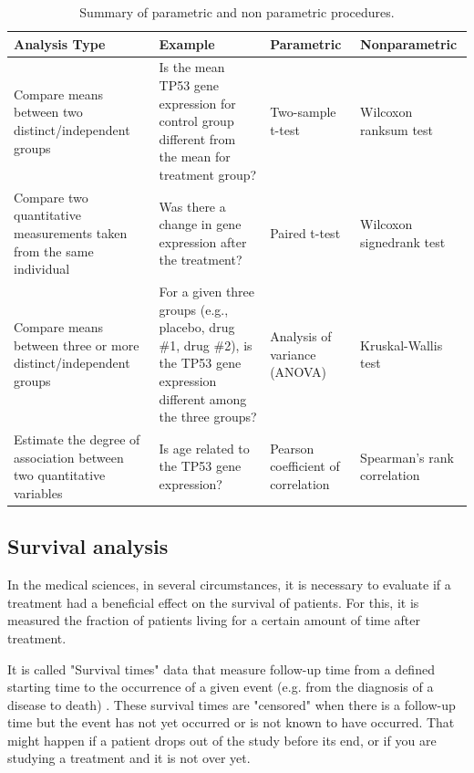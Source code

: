 \bgroup
\def\arraystretch{2.0}%

\begin{table}[h!]
\footnotesize
\centering
\caption{Summary of parametric and non parametric procedures.}
\label{Parametric-nonparametric}
\begin{tabular}{p{3.5cm}p{4cm}p{3cm}p{3cm}}
\toprule
\textbf{Analysis Type} & \textbf{Example} & \textbf{Parametric} & \textbf{Nonparametric} \\ \midrule
Compare means between two distinct/independent groups & Is the mean TP53 gene expression for control group different from the mean for treatment group? & Two-sample t-test & Wilcoxon ranksum test \\
Compare two quantitative measurements taken from the same individual & Was there a change in gene expression after the treatment? & Paired t-test & Wilcoxon signedrank test \\
Compare means between three or more distinct/independent groups & For a given three groups (e.g., placebo, drug \#1, drug \#2), is the TP53 gene expression different among the three groups? & Analysis of variance (ANOVA) & Kruskal-Wallis test \\
Estimate the degree of association between two quantitative variables & Is age related to the TP53 gene expression? & Pearson coefficient of correlation & Spearman’s rank correlation \\ \bottomrule
\end{tabular}
\end{table}
\egroup



\subsection{Survival analysis}

In the medical sciences, in several circumstances, it is necessary to evaluate if
a treatment had a beneficial effect on the survival of patients.
For this, it is measured the fraction of patients living for a certain amount of time after treatment.

It is called "Survival times" data that measure follow-up time from a
defined starting time to the occurrence of a given event
(e.g. from the diagnosis of a disease to death) \cite{bewick2004statistics}.
These survival times are "censored" when there is a follow-up time
but the event has not yet occurred or is not known to have occurred.
That might happen if a patient drops out of the study before its end,
or if you are studying a treatment and it is not over yet.

